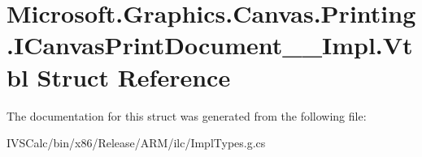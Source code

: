 \hypertarget{struct_microsoft_1_1_graphics_1_1_canvas_1_1_printing_1_1_i_canvas_print_document_____impl_1_1_vtbl}{}\section{Microsoft.\+Graphics.\+Canvas.\+Printing.\+I\+Canvas\+Print\+Document\+\_\+\+\_\+\+Impl.\+Vtbl Struct Reference}
\label{struct_microsoft_1_1_graphics_1_1_canvas_1_1_printing_1_1_i_canvas_print_document_____impl_1_1_vtbl}


The documentation for this struct was generated from the following file\+:\begin{DoxyCompactItemize}
\item 
I\+V\+S\+Calc/bin/x86/\+Release/\+A\+R\+M/ilc/Impl\+Types.\+g.\+cs\end{DoxyCompactItemize}

